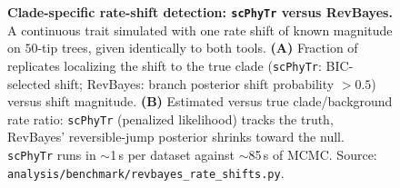 \documentclass{article}
\newcommand{\scphytr}{\texttt{scPhyTr}}
\begin{document}
\begin{figure}[t]
  \centering
  \caption{\textbf{Clade-specific rate-shift detection: \scphytr{} versus RevBayes.} A
  continuous trait simulated with one rate shift of known magnitude on $50$-tip trees, given
  identically to both tools. \textbf{(A)} Fraction of replicates localizing the shift to the
  true clade (\scphytr{}: BIC-selected shift; RevBayes: branch posterior shift probability
  $>0.5$) versus shift magnitude. \textbf{(B)} Estimated versus true clade/background rate
  ratio: \scphytr{} (penalized likelihood) tracks the truth, RevBayes' reversible-jump
  posterior shrinks toward the null. \scphytr{} runs in $\sim$1\,s per dataset against
  $\sim$85\,s of MCMC. Source: \texttt{analysis/benchmark/revbayes\_rate\_shifts.py}.}
  \label{fig:rateshift}
\end{figure}
\end{document}
